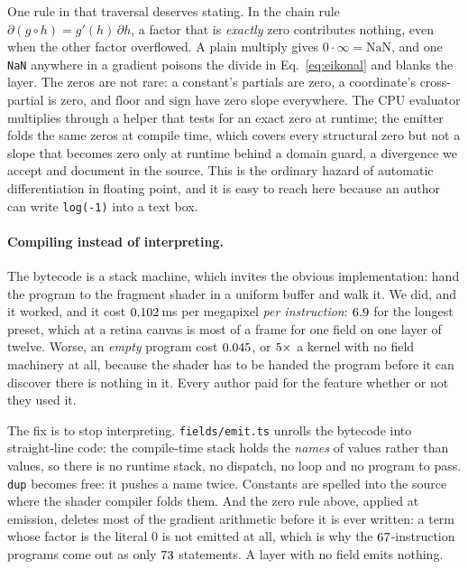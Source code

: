 One rule in that traversal deserves stating. In the chain rule $\partial(g\circ h)=g'(h)\,\partial h$, a factor that is
\emph{exactly} zero contributes nothing, even when the other factor
overflowed. A plain multiply gives $0\cdot\infty=\mathrm{NaN}$, and one
\texttt{NaN} anywhere in a gradient poisons the divide in Eq.~\ref{eq:eikonal}
and blanks the layer. The zeros are not rare: a constant's partials are zero, a
coordinate's cross-partial is zero, and $\mathrm{floor}$ and $\mathrm{sign}$
have zero slope everywhere. The CPU evaluator multiplies through a helper that
tests for an exact zero at runtime; the emitter folds the same zeros at compile
time, which covers every structural zero but not a slope that becomes zero only
at runtime behind a domain guard, a divergence we accept and document in the
source. This is the ordinary hazard of automatic differentiation in floating
point, and it is easy to reach here because an author can write
\texttt{log(-1)} into a text box.

\paragraph{Compiling instead of interpreting.}
The bytecode is a stack machine, which invites the obvious implementation: hand
the program to the fragment shader in a uniform buffer and walk it. We did, and it
worked, and it cost $0.102$\,ms per megapixel \emph{per instruction}:
$6.9$ for the longest preset, which at a retina canvas is most of a frame
for one field on one layer of twelve. Worse, an \emph{empty} program cost
$0.045$, or $5\times$ a kernel with no field machinery at
all, because the shader has to be handed the program before it can discover there
is nothing in it. Every author paid for the feature whether or not they used it.

The fix is to stop interpreting. \texttt{fields/emit.ts} unrolls the bytecode
into straight-line code: the compile-time stack holds the \emph{names} of values
rather than values, so there is no runtime stack, no dispatch, no loop and no
program to pass. \texttt{dup} becomes free: it pushes a name twice. Constants
are spelled into the source where the shader compiler folds them. And the zero
rule above, applied at emission, deletes most of the gradient arithmetic before
it is ever written: a term whose factor is the literal $0$ is not emitted at all,
which is why the $67$-instruction programs come out as only
$73$ statements. A layer with no field emits nothing.

